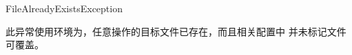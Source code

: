 \begin{XeClass}{FileAlreadyExistsException}
   
 此异常使用环境为，任意操作的目标文件已存在，而且相关配置中
 并未标记文件可覆盖。

\end{XeClass}
